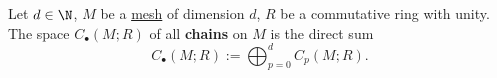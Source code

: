 \begin{definition}
  Let
    $d \in \N$,
    $M$ be a \hyperref[idec:mesh:definition]{mesh} of dimension $d$,
    $R$ be a commutative ring with unity.
  The space $C_\bullet(M; R)$ of all \textbf{chains} on $M$ is the direct sum
  \begin{equation}
    C_\bullet(M; R) := \bigoplus_{p = 0}^d
    \hyperref[idec:mesh_chain:definition]{C_p(M; R)}.
  \end{equation}
\end{definition}
